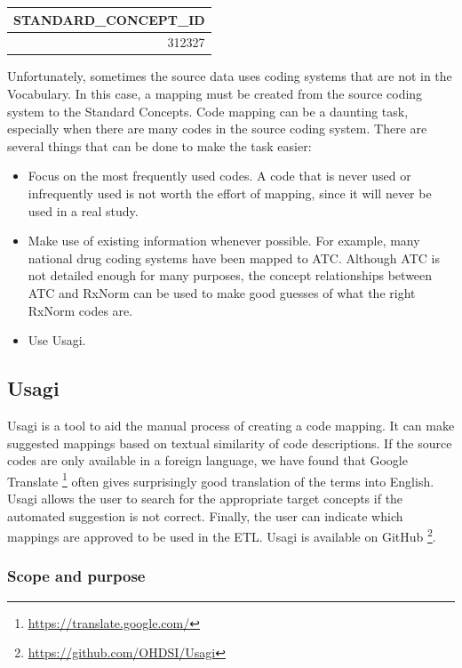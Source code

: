 \documentclass[11pt]{book}
\providecommand{\tightlist}{%
  \setlength{\itemsep}{0pt}\setlength{\parskip}{0pt}}
\let\rmarkdownfootnote\footnote%
\def\footnote{\protect\rmarkdownfootnote}
\theoremstyle{definition}
\theoremstyle{definition}
\theoremstyle{definition}
\theoremstyle{remark}
\begin{document}
\begin{longtable}[]{@{}r@{}}
\toprule
STANDARD\_CONCEPT\_ID\tabularnewline
\midrule
\endhead
312327\tabularnewline
\bottomrule
\end{longtable}

Unfortunately, sometimes the source data uses coding systems that are not in the Vocabulary. In this case, a mapping must be created from the source coding system to the Standard Concepts. Code mapping can be a daunting task, especially when there are many codes in the source coding system. There are several things that can be done to make the task easier:

\begin{itemize}
\tightlist
\item
  Focus on the most frequently used codes. A code that is never used or infrequently used is not worth the effort of mapping, since it will never be used in a real study.
\item
  Make use of existing information whenever possible. For example, many national drug coding systems have been mapped to ATC. Although ATC is not detailed enough for many purposes, the concept relationships between ATC and RxNorm can be used to make good guesses of what the right RxNorm codes are.
\item
  Use Usagi.
\end{itemize}

\hypertarget{usagi}{%
\subsection{Usagi}\label{usagi}}

Usagi is a tool to aid the manual process of creating a code mapping. It can make suggested mappings based on textual similarity of code descriptions. If the source codes are only available in a foreign language, we have found that Google Translate \footnote{\url{https://translate.google.com/}} often gives surprisingly good translation of the terms into English. Usagi allows the user to search for the appropriate target concepts if the automated suggestion is not correct. Finally, the user can indicate which mappings are approved to be used in the ETL. Usagi is available on GitHub \footnote{\url{https://github.com/OHDSI/Usagi}}.  

\hypertarget{scope-and-purpose-2}{%
\subsubsection*{Scope and purpose}\label{scope-and-purpose-2}}
\end{document}

